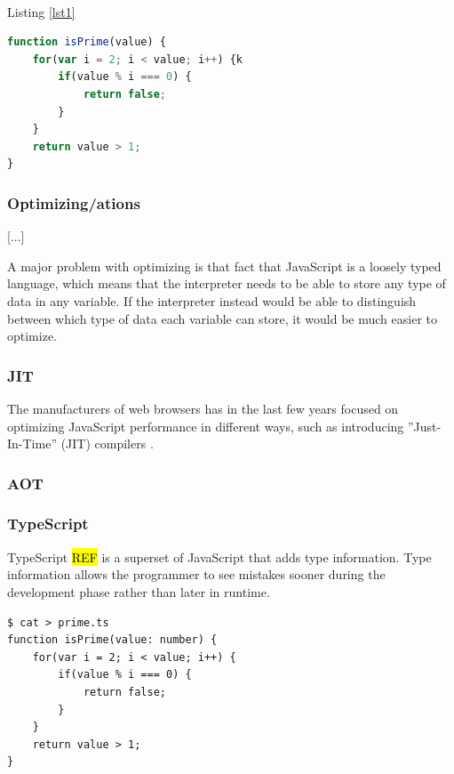 \blindtext\\
Listing \ref{lst1}

\begin{lstlisting}[language=JavaScript,numbers=none,caption=Listing 2,frame=shadowbox]
function isPrime(value) {
    for(var i = 2; i < value; i++) {k
        if(value % i === 0) {
            return false;
        }
    }
    return value > 1;
}
\end{lstlisting}

\blindtext

\subsubsection{Optimizing/ations}

[...]

A major problem with optimizing is that fact that JavaScript is a loosely typed language, which means that the interpreter needs to be able to store any type of data in any variable. If the interpreter instead would be able to distinguish between which type of data each variable can store, it would be much easier to optimize.

\subsubsection{JIT}

The manufacturers of web browsers has in the last few years focused on optimizing JavaScript performance in different ways, such as introducing ''Just-In-Time'' (JIT) compilers \parencite{HerreraChenLavoieHendren2018}.

\subsubsection{AOT}



\subsubsection{TypeScript}

TypeScript \hl{REF} is a superset of JavaScript that adds type information. Type information allows the programmer to see mistakes sooner during the development phase rather than later in runtime.

\begin{verbatim}
$ cat > prime.ts
function isPrime(value: number) {
    for(var i = 2; i < value; i++) {
        if(value % i === 0) {
            return false;
        }
    }
    return value > 1;
}
\end{verbatim}

